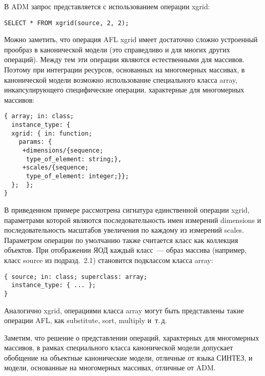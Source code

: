 \begin{multicols}{2}
\columnbreak
        
        В ADM запрос представляется с использованием операции {\sf xgrid}:
        \begin{verbatim}
SELECT * FROM xgrid(source, 2, 2);
\end{verbatim}
        
        Можно заметить, что операция AFL {\sf xgrid} имеет достаточно сложно 
устроенный прообраз в канонической модели (это справедливо и для многих 
других операций). Между тем эти операции являются естественными для 
массивов. Поэтому при интеграции ресурсов, основанных на многомерных 
массивах, в канонической модели возможно использование специального 
класса {\sf array}, инкапсулирующего специфические операции, характерные для 
многомерных массивов:
        \begin{verbatim}
{ array; in: class;
  instance_type: {
  xgrid: { in: function; 
    params: {
     +dimensions/{sequence; 
      type_of_element: string;},
     +scales/{sequence; 
      type_of_element: integer;}};
  };  };
}
\end{verbatim}
        В приведенном примере рассмотрена сигнатура единственной операции 
{\sf xgrid}, параметрами которой являются последовательность имен измерений\linebreak 
{\sf dimensions} и последовательность масштабов увеличения по каждому из 
измерений {\sf scales}. Па\-ра\-мет\-ром операции по умолчанию также считается 
класс как коллекция объектов. При отображении ЯОД каждый класс~--- 
образ массива (например, класс {\sf source} из подразд.~2.1) становится подклассом 
класса {\sf array}:
        \begin{verbatim}
{ source; in: class; superclass: array;
  instance_type: { ... };
}
\end{verbatim}

        Аналогично {\sf xgrid}, операциями класса {\sf array} могут быть 
представлены такие операции AFL, как {\sf substitute}, {\sf sort}, 
{\sf multiply} и~т.\,д. 
        
        Заметим, что решение о представлении операций, характерных для 
многомерных массивов, в рамках специального класса канонической модели 
допускает обобщение на объектные канонические модели, отличные от языка 
СИНТЕЗ, и модели, основанные на многомерных массивах, отличные от ADM.
        
        \smallskip
        

\end{multicols}
